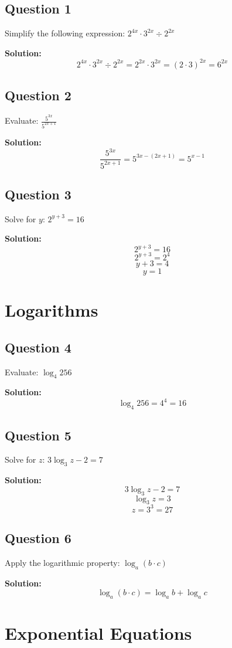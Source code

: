 \documentclass[12pt]{article}
\begin{document}
\subsection*{Question 1}
Simplify the following expression: $2^{4x} \cdot 3^{2x} \div 2^{2x}$

\textbf{Solution:}
\[2^{4x} \cdot 3^{2x} \div 2^{2x} = 2^{2x} \cdot 3^{2x} = (2 \cdot 3)^{2x} = 6^{2x}\]

\subsection*{Question 2}
Evaluate: $\frac{5^{3x}}{5^{2x+1}}$

\textbf{Solution:}
\[\frac{5^{3x}}{5^{2x+1}} = 5^{3x - (2x + 1)} = 5^{x - 1}\]

\subsection*{Question 3}
Solve for $y$: $2^{y+3} = 16$

\textbf{Solution:}
\[2^{y+3} = 16\]
\[2^{y+3} = 2^4\]
\[y + 3 = 4\]
\[y = 1\]

\section*{Logarithms}

\subsection*{Question 4}
Evaluate: $\log_4 256$

\textbf{Solution:}
\[\log_4 256 = 4^4 = 16\]

\subsection*{Question 5}
Solve for $z$: $3\log_3 z - 2 = 7$

\textbf{Solution:}
\[3\log_3 z - 2 = 7\]
\[\log_3 z = 3\]
\[z = 3^3 = 27\]

\subsection*{Question 6}
Apply the logarithmic property: $\log_a (b \cdot c)$

\textbf{Solution:}
\[\log_a (b \cdot c) = \log_a b + \log_a c\]

\section*{Exponential Equations}
\end{document}
